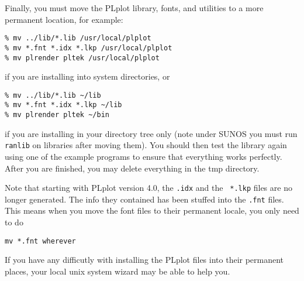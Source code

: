 Finally, you must move the PLplot library, fonts, and utilities to 
a more permanent location, for example:
\begin{verbatim}
% mv ../lib/*.lib /usr/local/plplot
% mv *.fnt *.idx *.lkp /usr/local/plplot
% mv plrender pltek /usr/local/plplot
\end{verbatim}
if you are installing into system directories, or
\begin{verbatim}
% mv ../lib/*.lib ~/lib
% mv *.fnt *.idx *.lkp ~/lib
% mv plrender pltek ~/bin
\end{verbatim}
if you are installing in your directory tree only (note under SUNOS you must
run {\tt ranlib} on libraries after moving them).  You should then test the
library again using one of the example programs to ensure that everything
works perfectly.  After you are finished, you may delete everything in the
tmp directory.

Note that starting with PLplot version 4.0, the {\tt *.idx} and the {\tt
*.lkp} files are no longer generated.  The info they contained has been
stuffed into the {\tt *.fnt} files.  This means when you move the font
files to their permanent locale, you only need to do
\begin{verbatim}
mv *.fnt wherever
\end{verbatim}

If you have any difficutly with installing the PLplot files into their
permanent places, your local unix system wizard may be able to help you.
